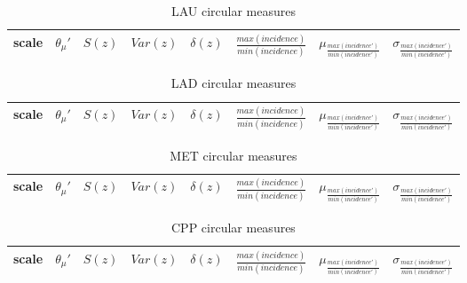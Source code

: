 \documentclass[%
 aip,
 jmp,%
 amsmath,amssymb,
 reprint,%
 floatfix,
]{revtex4-1}
\begin{document}
\begin{table}[!h]
	\caption{LAU circular measures}
\begin{center}
    \begin{tabular}{ |l|| c|c|c|c|c||c|c| }
        \hline
scale & $\theta_\mu'$ & $S(z)$ & $Var(z)$ & $\delta(z)$ & $\frac{max(incidence)}{min(incidence)}$ & $ \mu_{\frac{max(incidence')}{min(incidence')}} $ & $ \sigma_{\frac{max(incidence')}{min(incidence')} } $ \\ \hline\hline
	
    \end{tabular}
\end{center}
\label{tab:circLau}
\end{table}
\begin{table}[!h]
	\caption{LAD circular measures}
\begin{center}
    \begin{tabular}{ |l|| c|c|c|c|c||c|c| }
        \hline
scale & $\theta_\mu'$ & $S(z)$ & $Var(z)$ & $\delta(z)$ & $\frac{max(incidence)}{min(incidence)}$ & $ \mu_{\frac{max(incidence')}{min(incidence')}} $ & $ \sigma_{\frac{max(incidence')}{min(incidence')} } $ \\ \hline\hline
	
    \end{tabular}
\end{center}
\label{tab:circLad}
\end{table}
\begin{table}[!h]
	\caption{MET circular measures}
\begin{center}
    \begin{tabular}{ |l|| c|c|c|c|c||c|c| }
        \hline
scale & $\theta_\mu'$ & $S(z)$ & $Var(z)$ & $\delta(z)$ & $\frac{max(incidence)}{min(incidence)}$ & $ \mu_{\frac{max(incidence')}{min(incidence')}} $ & $ \sigma_{\frac{max(incidence')}{min(incidence')} } $ \\ \hline\hline
	
    \end{tabular}
\end{center}
\label{tab:circMet}
\end{table}
\begin{table}[!h]
	\caption{CPP circular measures}
\begin{center}
    \begin{tabular}{ |l|| c|c|c|c|c||c|c| }
        \hline
scale & $\theta_\mu'$ & $S(z)$ & $Var(z)$ & $\delta(z)$ & $\frac{max(incidence)}{min(incidence)}$ & $ \mu_{\frac{max(incidence')}{min(incidence')}} $ & $ \sigma_{\frac{max(incidence')}{min(incidence')} } $ \\ \hline\hline
	
    \end{tabular}
\end{center}
\label{tab:circCPP}
\end{table}
\end{document}

